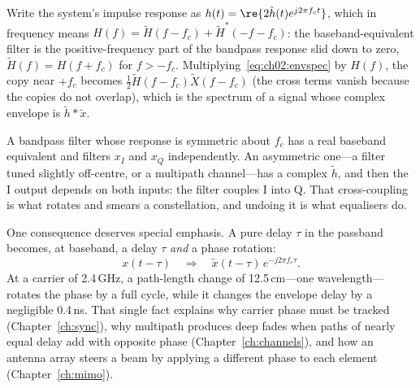 
\begin{deeper}
Write the system's impulse response as $h(t)=\re\{2\tilde{h}(t)e^{j2\pi f_c t}\}$, which in frequency
means $H(f)=\tilde H(f-f_c)+\tilde H^*(-f-f_c)$: the baseband-equivalent filter is the
positive-frequency part of the bandpass response slid down to zero, $\tilde H(f)=H(f+f_c)$ for
$f>-f_c$. Multiplying~\eqref{eq:ch02:envspec} by $H(f)$, the copy near $+f_c$ becomes
$\tfrac12\tilde H(f-f_c)\tilde X(f-f_c)$ (the cross terms vanish because the copies do not overlap),
which is the spectrum of a signal whose complex envelope is $\tilde h*\tilde x$.
\end{deeper}

A bandpass filter whose response is symmetric about $f_c$ has a real baseband equivalent and filters
$x_I$ and $x_Q$ independently. An asymmetric one---a filter tuned slightly off-centre, or a multipath
channel---has a complex $\tilde h$, and then the I output depends on both inputs: the filter couples I
into Q. That cross-coupling is what rotates and smears a constellation, and undoing it is what
equalisers do.

One consequence deserves special emphasis. A pure delay $\tau$ in the passband becomes, at
baseband, a delay $\tau$ \emph{and} a phase rotation:
\begin{equation}
x(t-\tau)\quad\Longrightarrow\quad\tilde x(t-\tau)\,e^{-j2\pi f_c\tau}.
\label{eq:ch02:delayrot}
\end{equation}
At a carrier of 2.4\,GHz, a path-length change of 12.5\,cm---one wavelength---rotates the phase by a
full cycle, while it changes the envelope delay by a negligible 0.4\,ns. That single fact explains
why carrier phase must be tracked (Chapter~\ref{ch:sync}), why multipath produces deep fades when
paths of nearly equal delay add with opposite phase (Chapter~\ref{ch:channels}), and how an antenna
array steers a beam by applying a different phase to each element (Chapter~\ref{ch:mimo}).


